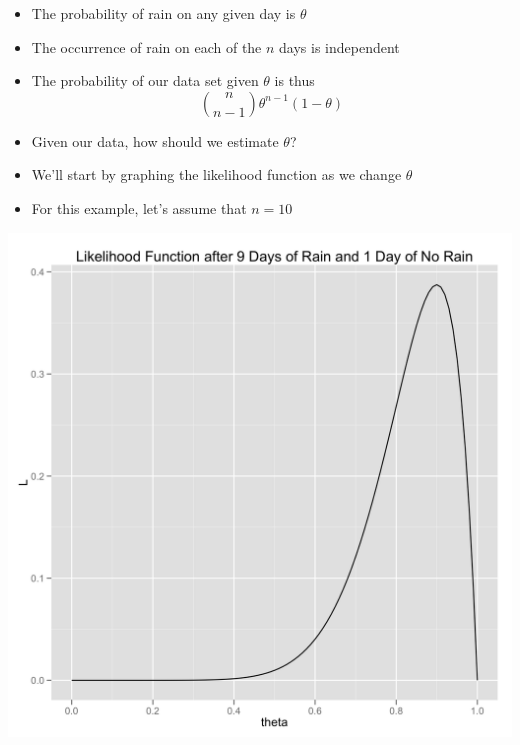 \documentclass{beamer}
\begin{document}
\frame
{
  \begin{itemize}
    \item{The probability of rain on any given day is $\theta$}
    \item{The occurrence of rain on each of the $n$ days is independent}
    \item{The probability of our data set given $\theta$ is thus}
  \[
  \binom{n}{n - 1} \theta ^ {n - 1} (1 - \theta)
  \]
  \end{itemize}
}

\frame
{
  \begin{itemize}
    \item{Given our data, how should we estimate $\theta$?}
    \item{We'll start by graphing the likelihood function as we change $\theta$}
    \item{For this example, let's assume that $n = 10$}
  \end{itemize}
}

\frame
{
  \begin{center}
    \includegraphics[scale = 0.1]{likelihood_function.png}
  \end{center}
}
\end{document}
